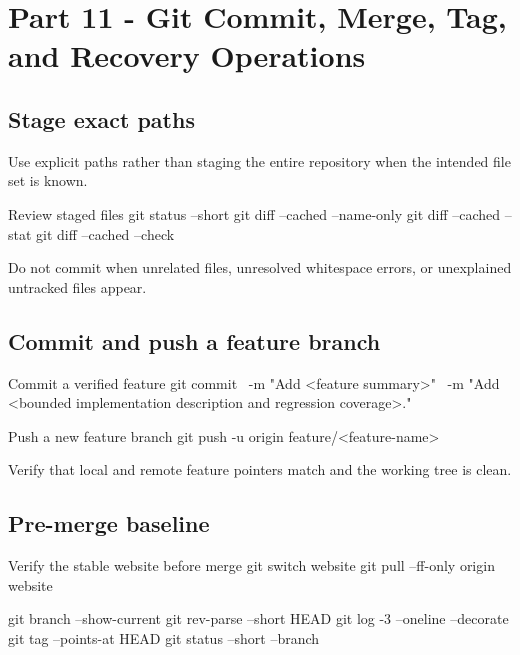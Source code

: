 \documentclass[11pt,letterpaper]{article}
\begin{document}
\section{Part 11 - Git Commit, Merge, Tag, and Recovery Operations}

\subsection{Stage exact paths}

Use explicit paths rather than staging the entire repository when the intended
file set is known.

\begin{commandbox}{Review staged files}
git status --short
git diff --cached --name-only
git diff --cached --stat
git diff --cached --check
\end{commandbox}

Do not commit when unrelated files, unresolved whitespace errors, or unexplained
untracked files appear.

\subsection{Commit and push a feature branch}

\begin{commandbox}{Commit a verified feature}
git commit \
  -m "Add <feature summary>" \
  -m "Add <bounded implementation description and regression coverage>."
\end{commandbox}

\begin{commandbox}{Push a new feature branch}
git push -u origin feature/<feature-name>
\end{commandbox}

Verify that local and remote feature pointers match and the working tree is
clean.

\subsection{Pre-merge baseline}

\begin{commandbox}{Verify the stable website before merge}
git switch website
git pull --ff-only origin website

git branch --show-current
git rev-parse --short HEAD
git log -3 --oneline --decorate
git tag --points-at HEAD
git status --short --branch
\end{commandbox}
\end{document}
